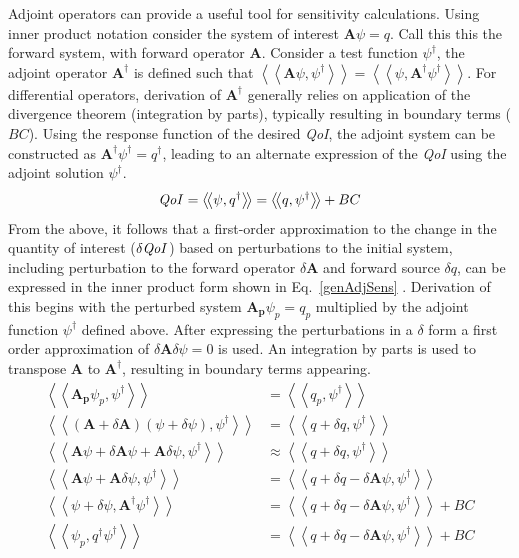 \documentclass[12pt]{report}
\newcommand{\braSN}{\left\langle \! \left\langle}
\newcommand{\ketSN}{\right\rangle \! \right\rangle}
\newcommand{\scalResp}{q^\dag}
\newcommand{\qoi}{{\it QoI}\xspace}
\begin{document}
Adjoint operators can provide a useful tool for sensitivity calculations. Using inner product 
notation consider the system of interest $\mathbf{A} \psi = q$. Call this this 
the forward system, with forward operator $\mathbf{A}$. Consider a test function $\psi^\dag$, the 
adjoint operator $\mathbf{A^\dag}$ is defined such that $\braSN \mathbf{A} \psi, \psi^\dag \ketSN = \braSN \psi, 
\mathbf{A^\dag} \psi^\dag \ketSN $. For differential operators, derivation of $\mathbf{A^\dag}$ generally relies on 
application of the divergence theorem (integration by parts), typically resulting in boundary 
terms ($BC$). Using the response function of the desired \qoi, the adjoint system can be constructed 
as $\mathbf{A^\dag} \psi^\dag = q^\dag$, leading to an alternate expression of the \qoi using the 
adjoint solution $\psi^\dag $.
\begin{equation}
\label{genAdjQoI}
\qoi = \braSN \psi, \scalResp \ketSN = \braSN q , \psi^\dag \ketSN + BC
\end{equation} 
From the above, it follows that a first-order approximation to the change in the quantity of interest ($\delta \qoi$)
based on perturbations to the initial system, including perturbation to the forward 
operator $\delta \mathbf{A}$ and forward source $\delta q$, can be expressed in the inner product form shown in Eq.~\eqref{genAdjSens} \cite{Marchuk}. Derivation of this begins with the perturbed system $\mathbf{A_p} \psi_p = q_p$ multiplied by the adjoint function $\psi^\dag$ defined above. After expressing the perturbations in a $\delta$ form a first order approximation of $\delta \mathbf{A} \delta \psi = 0$ is used. An integration by parts is used to transpose $\mathbf{A}$ to $\mathbf{A^\dag}$, resulting in boundary terms appearing. 
\begin{equation}
\begin{split}
\braSN \mathbf{A_p} \psi_p ,\psi^\dag\ketSN &= \braSN q_p ,\psi^\dag \ketSN \\
\braSN \left( \mathbf{A}+\delta \mathbf{A} \right) \left( \psi + \delta \psi \right),\psi^\dag\ketSN &= \braSN q+\delta q ,\psi^\dag \ketSN \\
\braSN \mathbf{A} \psi +\delta \mathbf{A} \psi + \mathbf{A} \delta \psi ,\psi^\dag\ketSN &\approx \braSN q+\delta q ,\psi^\dag \ketSN \\
\braSN \mathbf{A} \psi + \mathbf{A} \delta \psi ,\psi^\dag\ketSN &= \braSN q+\delta q - \delta \mathbf{A} \psi  ,\psi^\dag \ketSN \\
\braSN \psi +\delta \psi , \mathbf{A^\dag} \psi^\dag\ketSN &= \braSN q+\delta q - \delta \mathbf{A} \psi  ,\psi^\dag \ketSN + BC \\
\braSN \psi_p , q^\dag \psi^\dag\ketSN &= \braSN q+\delta q - \delta \mathbf{A} \psi  ,\psi^\dag \ketSN + BC \\
\end{split}
\end{equation}
\end{document}
